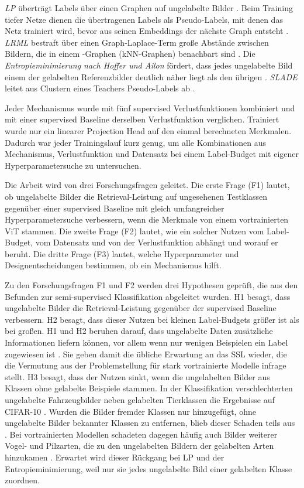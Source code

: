 \emph{\ac{LP}} überträgt Labels über einen Graphen auf ungelabelte Bilder \cite{zhu_learning_2002, zhou_learning_2003}. Beim Training tiefer Netze dienen die übertragenen Labels als Pseudo-Labels, mit denen das Netz trainiert wird, bevor aus seinen Embeddings der nächste Graph entsteht \cite{iscen_label_2019}. \emph{\ac{LRML}} bestraft über einen Graph-Laplace-Term große Abstände zwischen Bildern, die in einem -Graphen (\acs{kNN}-Graphen) benachbart sind \cite{hoi_semi-supervised_2010}. Die \emph{Entropieminimierung nach Hoffer und Ailon} fördert, dass jedes ungelabelte Bild einem der gelabelten Referenzbilder deutlich näher liegt als den übrigen \cite{hoffer_semi-supervised_2018}. \emph{\ac{SLADE}} leitet aus Clustern eines Teachers Pseudo-Labels ab \cite{duan_slade_2021}.

Jeder Mechanismus wurde mit fünf supervised Verlustfunktionen kombiniert und mit einer supervised Baseline derselben Verlustfunktion verglichen. Trainiert wurde nur ein linearer Projection Head auf den einmal berechneten Merkmalen. Dadurch war jeder Trainingslauf kurz genug, um alle Kombinationen aus Mechanismus, Verlustfunktion und Datensatz bei einem Label-Budget mit eigener Hyperparametersuche zu untersuchen.

Die Arbeit wird von drei Forschungsfragen geleitet. Die erste Frage (F1) lautet, ob ungelabelte Bilder die Retrieval-Leistung auf ungesehenen Testklassen gegenüber einer supervised Baseline mit gleich umfangreicher Hyperparametersuche verbessern, wenn die Merkmale von einem vortrainierten \ac{ViT} stammen. Die zweite Frage (F2) lautet, wie ein solcher Nutzen vom Label-Budget, vom Datensatz und von der Verlustfunktion abhängt und worauf er beruht. Die dritte Frage (F3) lautet, welche Hyperparameter und Designentscheidungen bestimmen, ob ein Mechanismus hilft.

Zu den Forschungsfragen F1 und F2 werden drei Hypothesen geprüft, die aus den Befunden zur semi-supervised Klassifikation abgeleitet wurden. H1 besagt, dass ungelabelte Bilder die Retrieval-Leistung gegenüber der supervised Baseline verbessern. H2 besagt, dass dieser Nutzen bei kleinen Label-Budgets größer ist als bei großen. H1 und H2 beruhen darauf, dass ungelabelte Daten zusätzliche Informationen liefern können, vor allem wenn nur wenigen Beispielen ein Label zugewiesen ist \cite{van_engelen_survey_2019}. Sie geben damit die übliche Erwartung an das \ac{SSL} wieder, die die Vermutung aus der Problemstellung für stark vortrainierte Modelle infrage stellt. H3 besagt, dass der Nutzen sinkt, wenn die ungelabelten Bilder aus Klassen ohne gelabelte Beispiele stammen. In der Klassifikation verschlechterten ungelabelte Fahrzeugbilder neben gelabelten Tierklassen die Ergebnisse auf CIFAR-10 \cite{oliver_realistic_2018}. Wurden die Bilder fremder Klassen nur hinzugefügt, ohne ungelabelte Bilder bekannter Klassen zu entfernen, blieb dieser Schaden teils aus \cite{he_reevaluating_2025}. Bei vortrainierten Modellen schadeten dagegen häufig auch Bilder weiterer Vogel- und Pilzarten, die zu den ungelabelten Bildern der gelabelten Arten hinzukamen \cite{su_realistic_2021}. Erwartet wird dieser Rückgang bei \ac{LP} und der Entropieminimierung, weil nur sie jedes ungelabelte Bild einer gelabelten Klasse zuordnen.

